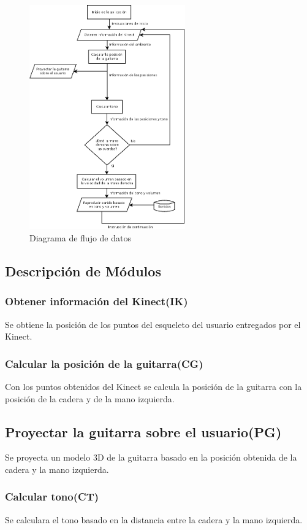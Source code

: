 \documentclass[a4paper,12pt]{article}
\begin{document}
\begin{figure}[h!]
        \centering
        \includegraphics[width=0.6\textwidth]{../imagenes/diagrama_de_flujo.png}
        \caption{Diagrama de flujo de datos}
        \label{fig:flujo}
\end{figure}
\newpage

\subsection{Descripción de Módulos}
\subsubsection{Obtener información del Kinect(IK)}
Se obtiene la posición de los puntos del esqueleto del usuario entregados por el Kinect.
\subsubsection{Calcular la posición de la guitarra(CG)}
Con los puntos obtenidos del Kinect se calcula la posición de la guitarra con la posición de la cadera y de la mano izquierda.
\subsection{Proyectar la guitarra sobre el usuario(PG)}
Se proyecta un modelo 3D de la guitarra basado en la posición obtenida de la cadera y la mano izquierda.
\subsubsection{Calcular tono(CT)}
Se calculara el tono basado en la distancia entre la cadera y la mano izquierda.
\end{document}
